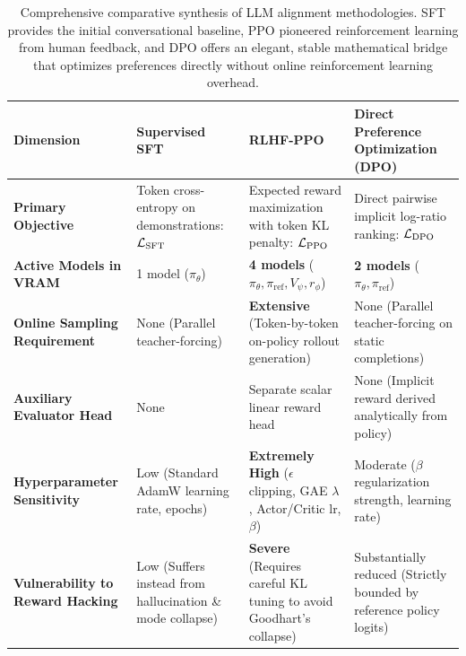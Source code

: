 \documentclass[../../../main.tex]{subfiles}
\begin{document}
\begin{table}[t]
\centering
\small\sffamily
{}
\begin{tabularx}{\textwidth}{lXXX}
\toprule
\textbf{Dimension} & \textbf{Supervised SFT} & \textbf{RLHF-PPO} & \textbf{Direct Preference Optimization (DPO)} \\
\midrule
\textbf{Primary Objective} & Token cross-entropy on demonstrations: $\mathcal{L}_{\text{SFT}}$ & Expected reward maximization with token KL penalty: $\mathcal{L}_{\text{PPO}}$ & Direct pairwise implicit log-ratio ranking: $\mathcal{L}_{\text{DPO}}$ \\
\midrule
\textbf{Active Models in VRAM} & 1 model ($\pi_\theta$) & \textbf{4 models} ($\pi_\theta, \pi_{\text{ref}}, V_\psi, r_\phi$) & \textbf{2 models} ($\pi_\theta, \pi_{\text{ref}}$) \\
\midrule
\textbf{Online Sampling Requirement} & None (Parallel teacher-forcing) & \textbf{Extensive} (Token-by-token on-policy rollout generation) & None (Parallel teacher-forcing on static completions) \\
\midrule
\textbf{Auxiliary Evaluator Head} & None & Separate scalar linear reward head & None (Implicit reward derived analytically from policy) \\
\midrule
\textbf{Hyperparameter Sensitivity} & Low (Standard AdamW learning rate, epochs) & \textbf{Extremely High} ($\epsilon$ clipping, GAE $\lambda$, Actor/Critic lr, $\beta$) & Moderate ($\beta$ regularization strength, learning rate) \\
\midrule
\textbf{Vulnerability to Reward Hacking} & Low (Suffers instead from hallucination \& mode collapse) & \textbf{Severe} (Requires careful KL tuning to avoid Goodhart's collapse) & Substantially reduced (Strictly bounded by reference policy logits) \\
\bottomrule
\end{tabularx}
\caption{Comprehensive comparative synthesis of LLM alignment methodologies. SFT provides the initial conversational baseline, PPO pioneered reinforcement learning from human feedback, and DPO offers an elegant, stable mathematical bridge that optimizes preferences directly without online reinforcement learning overhead.}
\label{tab:alignment_paradigms_synthesis}
\end{table}
\end{document}
